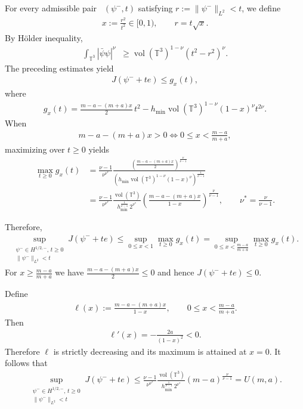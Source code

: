\documentclass[11pt,final]{amsart}
\newcommand{\T}{\mathbb{T}}
\newcommand{\dd}{\mathop{}\!\mathrm{d}}
\DeclareMathOperator{\dv}{\dd{vol}}
\begin{document}
For every admissible pair ~$(\psi^-,t)$ satisfying $r:=\|\psi^-\|_{L^2}<t$, we define
\begin{align}
x:=\frac{r^{2}}{t^{2}}\in[0,1),\qquad r=t\sqrt{x}.
\end{align}
By H\"older inequality, 
\begin{align}
    \int_{\T^3} |\bar{\psi}\psi|^\nu\dv
       \geq  {\operatorname{vol}(\mathbb{T}^3)}^{1-\nu}(t^2-r^2)^{\nu}.
    \end{align}
The preceding estimates yield    
\begin{align}
J(\psi^-+te)\le g_x(t),
\end{align}
where
\begin{align}
g_x(t)
=
\frac{m-a-(m+a)x}{2}\,t^2
-
h_{\min}\operatorname{vol}(\mathbb T^3)^{1-\nu}
(1-x)^\nu t^{2\nu}.
\end{align}
When
\begin{align}
m-a-(m+a)x>0\Leftrightarrow 0\leq x<\frac{m-a}{m+a},
\end{align}
maximizing over $t\ge0$ yields
\begin{align}
\max_{t\ge0}g_x(t)
&=
\frac{\nu-1}{\nu^{\nu^*}}
\frac{
\left(\frac{m-a-(m+a)x}{2}\right)^{\frac{\nu}{\nu-1}}
}{
\left(
h_{\min}\operatorname{vol}(\mathbb T^3)^{1-\nu}
(1-x)^\nu
\right)^{\frac1{\nu-1}}
}\\
&=
\frac{\nu-1}{\nu^{\nu^*}}
\frac{\operatorname{vol}(\mathbb T^3)}
{h_{\min}^{\frac1{\nu-1}}\,2^{\nu^*}}
\left(
\frac{m-a-(m+a)x}{1-x}
\right)^{\frac{\nu}{\nu-1}},\qquad \nu^*=\frac{\nu}{\nu-1}.
\end{align}

Therefore,
\begin{align}
\sup_{\substack{\psi^-\in H^{1/2,-},\,t\ge0\\
\|\psi^-\|_{L^2}<t}}
J(\psi^-+te)
\le
\sup_{0\le x<1}\max_{t\ge0}g_x(t)=\sup_{0\le x<\frac{m-a}{m+a}}
\max_{t\ge0}g_x(t).
\end{align}
For $x\geq\frac{m-a}{m+a}$ we have $\frac{m-a-(m+a)x}{2}\leq0$ and hence
$J(\psi^-+te)\leq0$.

Define
\begin{align}
\ell(x):=\frac{m-a-(m+a)x}{1-x},
\qquad
0\leq x<\frac{m-a}{m+a}.
\end{align}
Then
\begin{align}
\ell'(x)=-\frac{2a}{(1-x)^2}<0.
\end{align}
Therefore $\ell$ is strictly decreasing and its maximum is attained at $x=0$. It follows that
\begin{align}
\sup_{\substack{\psi^-\in H^{1/2,-},\,t\ge0\\
\|\psi^-\|_{L^2}<t}}
J(\psi^-+te)
\leq
\frac{\nu-1}{\nu^{\nu^*}}
\frac{\operatorname{vol}(\mathbb T^3)}
{h_{\min}^{\frac1{\nu-1}}\,2^{\nu^*}}
(m-a)^{\frac{\nu}{\nu-1}}=U(m,a).
\end{align}
\end{document}
